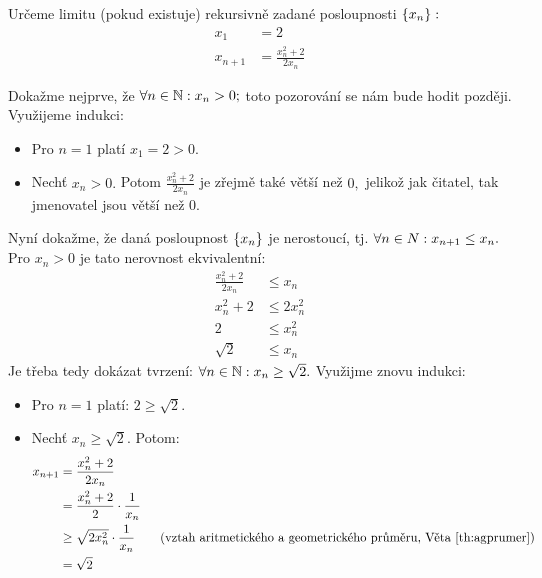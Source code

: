 \begin{remark}
    Určeme limitu (pokud existuje) rekursivně zadané posloupnosti $\left\{x_n\right\}:$
    \begin{align*}
        x_1 &= 2 \\
        x_{n+1} &= \frac{x_n^2 + 2}{2x_n}
    \end{align*}

    Dokažme nejprve, že $\forall n \in \mathbb{N}: x_n > 0;$ toto pozorování se nám bude
    hodit později. Využijeme indukci:
    \begin{itemize}
        \item Pro $n=1$ platí $x_1 = 2 > 0.$
        \item Nechť $x_n > 0.$ Potom $\frac{x_n^2 + 2}{2x_n}$ je zřejmě také
            větší než $0,$ jelikož jak čitatel, tak jmenovatel jsou větší 
            než $0.$
    \end{itemize}

    Nyní dokažme, že daná posloupnost $\left\{x_n\right\}$ je nerostoucí, tj. $\forall n 
    \in N: x_{n+1} \leq x_n.$ Pro $x_n > 0$ je tato nerovnost ekvivalentní:
    \begin{align*}
        \frac{x_n^2 + 2}{2x_n} &\leq x_n \\
        x_n^2 + 2 &\leq 2x_n^2 \\
        2 &\leq x_n^2 \\
        \sqrt{2} &\leq x_n
    \end{align*}
    Je třeba tedy dokázat tvrzení: $\forall n \in \mathbb{N}: x_n \geq \sqrt{2}.$ Využijme
    znovu indukci:
    \begin{itemize}
        \item Pro $n=1$ platí: $2 \geq \sqrt{2}.$
        \item Nechť $x_n \geq \sqrt{2}$. Potom:
            \begin{align*}
                x_{n+1} &= \frac{x_n^2 + 2}{2x_n} \\
                &= \frac{x_n^2 +2}{2} \cdot \frac{1}{x_n} \\
                &\geq \sqrt{2x_n^2} \cdot \frac{1}{x_n} 
                \tag{vztah aritmetického a geometrického průměru, Věta~\ref{th:agprumer}} \\
                &= \sqrt{2}
            \end{align*}
    \end{itemize}


\end{remark}
